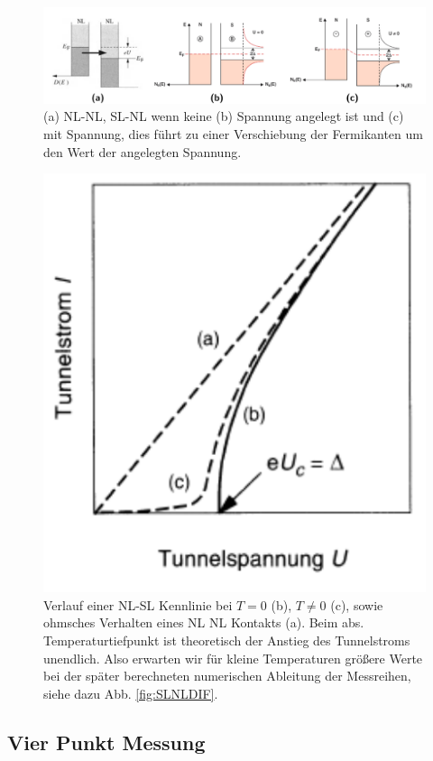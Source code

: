 \documentclass[twoside,        %
               BCOR12mm,       %
               english,ngerman, %
               fleqn,headsepline=false,footsepline=false
              ]{MFPREPORT}
\begin{document}
\begin{figure}
\centering
\includegraphics[scale=0.5]{tunnel.png}
\caption{(a) NL-NL, SL-NL wenn keine (b) Spannung angelegt ist und (c) mit Spannung, dies
führt zu einer Verschiebung der Fermikanten um den Wert der angelegten Spannung.}
\label{fig:tunnel1}
\end{figure}

\begin{figure}
\centering
\includegraphics[scale=0.6]{kennlinie.png}
\caption{Verlauf einer NL-SL Kennlinie bei $T=0$ (b), $T \neq 0$ (c), sowie ohmsches
Verhalten eines NL NL Kontakts (a). Beim abs. Temperaturtiefpunkt ist theoretisch der Anstieg
des Tunnelstroms unendlich. Also erwarten wir für kleine Temperaturen größere Werte bei der später
berechneten numerischen Ableitung der Messreihen, siehe dazu Abb. \ref{fig:SLNLDIF}.}
\label{fig:tunnel2}
\end{figure}


\subsection{Vier Punkt Messung}
\end{document}
